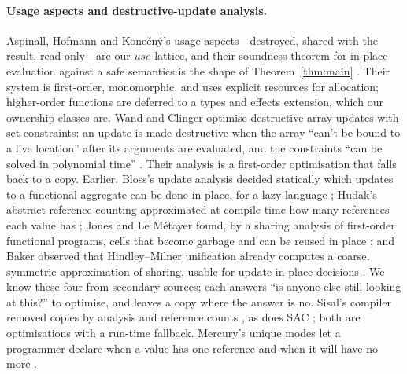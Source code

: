 \paragraph{Usage aspects and destructive-update analysis.} Aspinall, Hofmann and Kone\v{c}n\'y's usage
aspects---destroyed, shared with the result, read only---are our $\mathit{use}$ lattice, and their
soundness theorem for in-place evaluation against a safe semantics is the shape of
Theorem~\ref{thm:main} \citep{aspinall2002another,aspinall2008usage}. Their system is first-order,
monomorphic, and uses explicit resources for allocation; higher-order functions are deferred to a types
and effects extension, which our ownership classes are. Wand and Clinger optimise destructive array updates
with set constraints: an update is made destructive when the array ``can't be bound to a live location''
after its arguments are evaluated, and the constraints ``can be solved in polynomial time''
\citep{wand2001set}. Their analysis is a first-order optimisation that falls back to a copy. Earlier,
Bloss's update analysis decided statically which updates to a functional aggregate can be done in place,
for a lazy language \citep{bloss1989update}; Hudak's abstract reference counting approximated at compile
time how many references each value has \citep{hudak1986semantic}; Jones and Le M\'etayer found, by a
sharing analysis of first-order functional programs, cells that become garbage and can be reused in place
\citep{jones1989compile}; and Baker observed that Hindley--Milner unification already computes a coarse,
symmetric approximation of sharing, usable for update-in-place decisions \citep{baker1990unify}. We know
these four from secondary sources; each answers ``is anyone else still looking at this?'' to optimise, and
leaves a copy where the answer is no. Sisal's compiler removed copies by analysis and reference counts
\citep{cann1990sisal}, as does SAC \citep{grelck2006sac,grelck2004implicit}; both are optimisations with a
run-time fallback. Mercury's unique modes let a programmer declare when a value has one reference and when
it will have no more \citep{mercury2026unique}.

